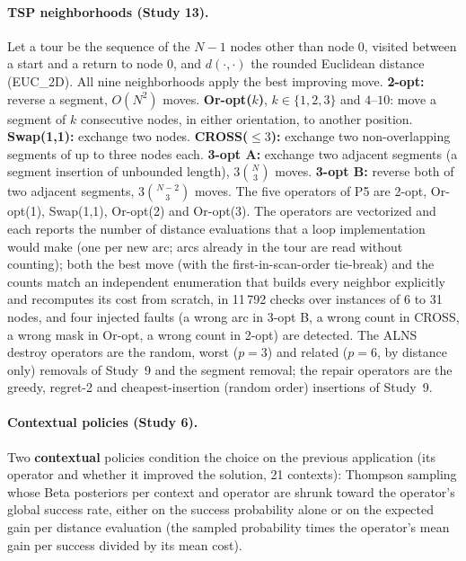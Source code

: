 \paragraph{TSP neighborhoods (Study 13).} Let a tour be the sequence of the $N-1$ nodes other than node 0, visited between a start and a return to node 0, and $d(\cdot,\cdot)$ the rounded Euclidean distance (EUC\_2D). All nine neighborhoods apply the best improving move. \textbf{2-opt:} reverse a segment, $O(N^2)$ moves. \textbf{Or-opt($k$)}, $k\in\{1,2,3\}$ and $4$--$10$: move a segment of $k$ consecutive nodes, in either orientation, to another position. \textbf{Swap(1,1):} exchange two nodes. \textbf{CROSS($\le3$):} exchange two non-overlapping segments of up to three nodes each. \textbf{3-opt A:} exchange two adjacent segments (a segment insertion of unbounded length), $3\binom{N}{3}$ moves. \textbf{3-opt B:} reverse both of two adjacent segments, $3\binom{N-2}{3}$ moves. The five operators of P5 are 2-opt, Or-opt(1), Swap(1,1), Or-opt(2) and Or-opt(3). The operators are vectorized and each reports the number of distance evaluations that a loop implementation would make (one per new arc; arcs already in the tour are read without counting); both the best move (with the first-in-scan-order tie-break) and the counts match an independent enumeration that builds every neighbor explicitly and recomputes its cost from scratch, in 11\,792 checks over instances of 6 to 31 nodes, and four injected faults (a wrong arc in 3-opt B, a wrong count in CROSS, a wrong mask in Or-opt, a wrong count in 2-opt) are detected. The ALNS destroy operators are the random, worst ($p=3$) and related ($p=6$, by distance only) removals of Study~9 and the segment removal; the repair operators are the greedy, regret-2 and cheapest-insertion (random order) insertions of Study~9.

\paragraph{Contextual policies (Study 6).} Two \textbf{contextual} policies condition the choice on the previous application (its operator and whether it improved the solution, 21 contexts): Thompson sampling whose Beta posteriors per context and operator are shrunk toward the operator's global success rate, either on the success probability alone or on the expected gain per distance evaluation (the sampled probability times the operator's mean gain per success divided by its mean cost).

